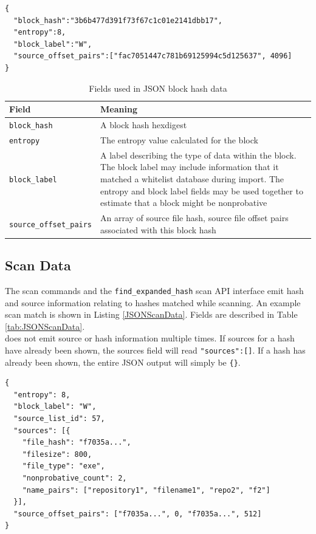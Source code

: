 \documentclass[11pt,fleqn]{article} %
\begin{document}
\lstset{style=customfile}
\begin{lstlisting}[caption={Example JSON block hash data used during import/export}, label=JSONBlockHashData]
{
  "block_hash":"3b6b477d391f73f67c1c01e2141dbb17",
  "entropy":8,
  "block_label":"W",
  "source_offset_pairs":["fac7051447c781b69125994c5d125637", 4096]
}
\end{lstlisting}

\begin{table}[!ht]

\centering
\caption{Fields used in JSON block hash data}
\label{tab:JSONBlockHashData}
\begin{tabular}{|p{5 cm}|p{8.8 cm}|}
\hline \hline
\textbf{Field} & \textbf{Meaning} \\
\hline
\verb+block_hash+ & A block hash hexdigest\\
\hline
\verb+entropy+ & The entropy value calculated for the block\\
\hline
\verb+block_label+ & A label describing the type of data within the block. The block label may include information that it matched a whitelist database during import. The entropy and block label fields may be used together to estimate that a block might be nonprobative\\
\hline
\verb+source_offset_pairs+ & An array of source file hash, source file offset pairs associated with this block hash\\
\hline
\end{tabular}
\end{table}

\subsection{Scan Data}
The \hdb scan commands and the \verb+find_expanded_hash+ scan API interface emit hash and source information relating to hashes matched while scanning. An example scan match is shown in Listing \ref{JSONScanData}. Fields are described in Table \ref{tab:JSONScanData}.\\

\hdb does not emit source or hash information multiple times.  If sources for a hash have already been shown, the sources field will read \verb+"sources":[]+. If a hash has already been shown, the entire JSON output will simply be \verb+{}+.\\

\lstset{style=customfile}
\begin{lstlisting}[float, caption={Example JSON block hash data output from a scan match}, label=JSONScanData]
{
  "entropy": 8,
  "block_label": "W",
  "source_list_id": 57,
  "sources": [{
    "file_hash": "f7035a...",
    "filesize": 800,
    "file_type": "exe",
    "nonprobative_count": 2,
    "name_pairs": ["repository1", "filename1", "repo2", "f2"]
  }],
  "source_offset_pairs": ["f7035a...", 0, "f7035a...", 512]
}
\end{lstlisting}
\end{document}
